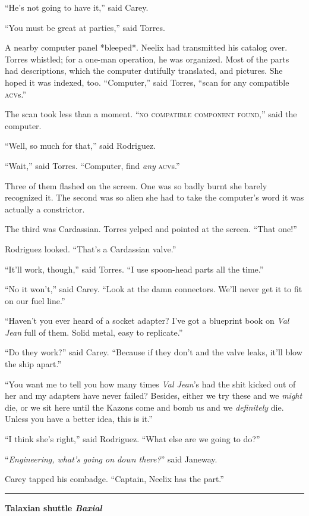 \documentclass[twoside,letterpaper,12pt]{memoir}
\begin{document}
``He's not going to have it,'' said Carey.

``You must be great at parties,'' said Torres.

A nearby computer panel *bleeped*. Neelix had transmitted his catalog over. Torres whistled; for a one-man operation, he was organized. Most of the parts had descriptions, which the computer dutifully translated, and pictures. She hoped it was indexed, too. ``Computer,'' said Torres, ``scan for any compatible \textsc{acv}s.''

The scan took less than a moment. ``\textsc{no compatible component found},'' said the computer.

``Well, so much for that,'' said Rodriguez.

``Wait,'' said Torres. ``Computer, find \textit{any} \textsc{acv}s.''

Three of them flashed on the screen. One was so badly burnt she barely recognized it. The second was so alien she had to take the computer's word it was actually a constrictor.

The third was Cardassian. Torres yelped and pointed at the screen. ``That one!''

Rodriguez looked. ``That's a Cardassian valve.''

``It'll work, though,'' said Torres. ``I use spoon-head parts all the time.''

``No it won't,'' said Carey. ``Look at the damn connectors. We'll never get it to fit on our fuel line.''

``Haven’t you ever heard of a socket adapter? I’ve got a blueprint book on \textit{Val Jean }full of them. Solid metal, easy to replicate.''

``Do they work?'' said Carey. ``Because if they don't and the valve leaks, it'll blow the ship apart.''

``You want me to tell you how many times \textit{Val Jean}'s had the shit kicked out of her and my adapters have never failed? Besides, either we try these and we \textit{might} die, or we sit here until the Kazons come and bomb us and we \textit{definitely} die. Unless you have a better idea, this is it.''

``I think she's right,'' said Rodriguez. ``What else are we going to do?''

``\textit{Engineering, what's going on down there?}'' said Janeway.

Carey tapped his combadge. ``Captain, Neelix has the part.''

\fancybreak{\rule{3cm}{0.4 pt}}
\noindent\textbf{Talaxian shuttle \textit{Baxial}}\\
\end{document}
